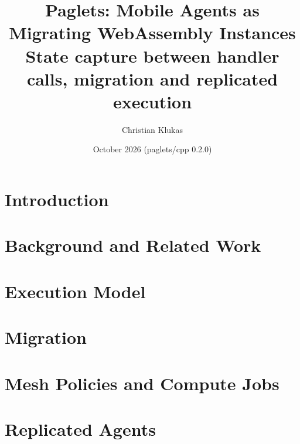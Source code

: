%



\title{\color{pagletsBlue}\Large\bfseries Paglets: Mobile Agents as Migrating WebAssembly Instances\\[0.35em]
  \normalsize\normalfont\color{pagletsMuted}State capture between handler calls, migration and replicated execution}
\author{\normalsize Christian Klukas}
\date{\normalsize October 2026 \quad\textcolor{pagletsMuted}{(paglets/cpp 0.2.0)}}



\maketitle
\thispagestyle{fancy}



\section{Introduction}\label{sec:introduction}

\section{Background and Related Work}\label{sec:background}

\section{Execution Model}\label{sec:model}


\section{Migration}\label{sec:movement}


\section{Mesh Policies and Compute Jobs}\label{sec:mesh}


\section{Replicated Agents}\label{sec:zombies}


